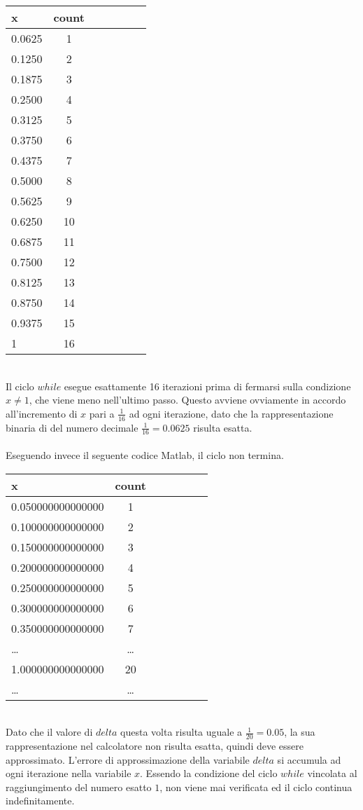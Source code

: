 

\begin{tabular}{l*{6}{c}}
 x  &  count \\
\hline
 0.0625 & 1 \\
 0.1250 & 2 \\
 0.1875 & 3 \\
 0.2500 & 4 \\
 0.3125 & 5 \\
 0.3750 & 6 \\
 0.4375 & 7 \\
 0.5000 & 8 \\
 0.5625 & 9 \\
 0.6250 & 10 \\
 0.6875 & 11 \\
 0.7500 & 12 \\
 0.8125 & 13 \\
 0.8750 & 14 \\
 0.9375 & 15 \\
      1 & 16 \\
\end{tabular} \\

\noindent Il ciclo \(while\) esegue esattamente 16 iterazioni prima di fermarsi sulla condizione \(x \neq 1\), che viene meno nell'ultimo passo. Questo avviene ovviamente in accordo all'incremento di \(x\) pari a \(\frac{1}{16}\) ad ogni iterazione, dato che la rappresentazione binaria di del numero decimale \(\frac{1}{16} = 0.0625\) risulta esatta.
\\
\\
\noindent Eseguendo invece il seguente codice Matlab, il ciclo non termina.



\begin{tabular}{l*{6}{c}}
 x  &  count \\
\hline
 0.050000000000000 & 1 \\
 0.100000000000000 & 2 \\
 0.150000000000000 & 3 \\
 0.200000000000000 & 4 \\
 0.250000000000000 & 5 \\
 0.300000000000000 & 6 \\
 0.350000000000000 & 7 \\
 \ldots & \ldots \\
 1.000000000000000 & 20 \\
 \ldots & \ldots \\
\end{tabular} \\

Dato che il valore di \(delta\) questa volta risulta uguale a \(\frac{1}{20} = 0.05\), la sua rappresentazione nel calcolatore non risulta esatta, quindi deve essere approssimato. L'errore di approssimazione della variabile \(delta\) si accumula ad ogni iterazione nella variabile \(x\). Essendo la condizione del ciclo \(while\) vincolata al raggiungimento del numero esatto \(1\), non viene mai verificata ed il ciclo continua indefinitamente.
